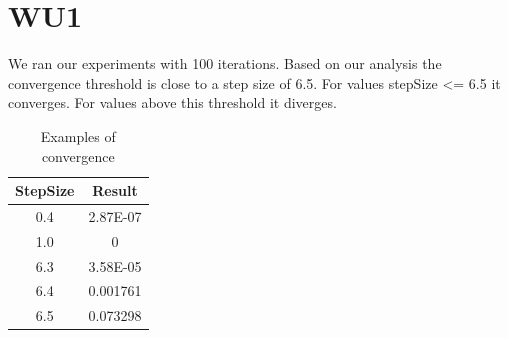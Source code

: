 \section{WU1}

We ran our experiments with 100 iterations. Based on our analysis the convergence threshold is close to a step size of 6.5. For values stepSize <= 6.5 it converges. 
For values above this threshold it diverges.

\begin{table}[ht]
\centering %
\begin{tabular}{c c} %
\hline\hline %
StepSize & Result \\ [0.5ex] %
\hline %
0.4 & 2.87E-07 \\ %
1.0 & 0 \\
6.3 & 3.58E-05 \\
6.4 & 0.001761 \\
6.5 & 0.073298 \\ [1ex] %
\hline %
\end{tabular}
\label{table:convergence} %
\caption{Examples of convergence} %
\end{table}



